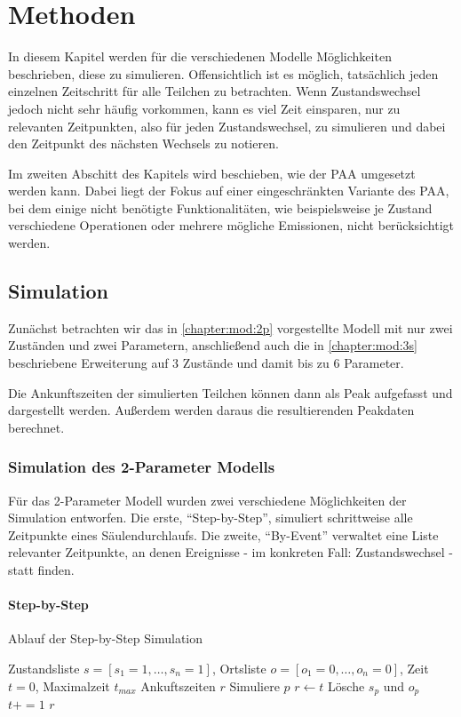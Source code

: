 \chapter{Methoden} 
\label{chapter:meth}

In diesem Kapitel werden für die verschiedenen Modelle Möglichkeiten beschrieben, diese zu simulieren. Offensichtlich ist es möglich, tatsächlich jeden einzelnen Zeitschritt für alle Teilchen zu betrachten. Wenn Zustandswechsel jedoch nicht sehr häufig vorkommen, kann es viel Zeit einsparen, nur zu relevanten Zeitpunkten, also für jeden Zustandswechsel, zu simulieren und dabei den Zeitpunkt des nächsten Wechsels zu notieren.

Im zweiten Abschitt des Kapitels wird beschieben, wie der PAA umgesetzt werden kann. Dabei liegt der Fokus auf einer eingeschränkten Variante des PAA, bei dem einige nicht benötigte Funktionalitäten, wie beispielsweise je Zustand verschiedene Operationen oder mehrere mögliche Emissionen, nicht berücksichtigt werden.


\section{Simulation}
Zunächst betrachten wir das in \ref{chapter:mod:2p} vorgestellte Modell mit nur zwei Zuständen und zwei Parametern, anschließend auch die in \ref{chapter:mod:3s} beschriebene Erweiterung auf 3 Zustände und damit bis zu 6 Parameter.

Die Ankunftszeiten der simulierten Teilchen können dann als Peak aufgefasst und dargestellt werden. Außerdem werden daraus die resultierenden Peakdaten berechnet.


\subsection{Simulation des 2-Parameter Modells}
Für das 2-Parameter Modell wurden zwei verschiedene Möglichkeiten der Simulation entworfen. Die erste, ``Step-by-Step'', simuliert schrittweise alle Zeitpunkte eines Säulendurchlaufs. Die zweite, ``By-Event'' verwaltet eine Liste relevanter Zeitpunkte, an denen Ereignisse - im konkreten Fall: Zustandswechsel - statt finden.

\subsubsection{Step-by-Step}
\begin{algorithm}
\caption{Ablauf der Step-by-Step Simulation}
\label{algo_by_Step}
\begin{algorithmic}
\REQUIRE Zustandsliste $s= [s_1 = 1, \ldots, s_n=1]$, Ortsliste $o=[o_1=0, \ldots , o_n=0]$, Zeit $t=0$, Maximalzeit $t_{max}$
\ENSURE Ankuftszeiten $r$
\STATE Simuliere $p$
\STATE $r \leftarrow t$
\STATE Lösche $s_p$ und $o_p$
\ENDIF
\ENDFOR
\STATE $t +=1$
\ENDWHILE
\RETURN $r$
\end{algorithmic}
\end{algorithm}

